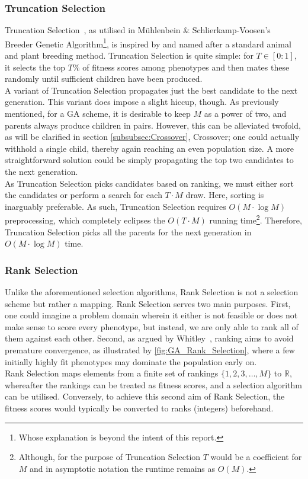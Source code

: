 \subsubsection{Truncation Selection}
Truncation Selection~\cite{Wiki-truncation-selection}, as utilised in Mühlenbein \& Schlierkamp-Voosen's~\cite{Truncation-Selection-Breeder-Algorithm} Breeder Genetic Algorithm\footnote{Whose explanation is beyond the intent of this report.}, is inspired by and named after a standard animal and plant breeding method. Truncation Selection is quite simple: for \(T \in [0:1]\), it selects the top $T\%$ of fitness scores among phenotypes and then mates these randomly until sufficient children have been produced.
\\
A variant of Truncation Selection propagates just the best candidate to the next generation. This variant does impose a slight hiccup, though. As previously mentioned, for a GA scheme, it is desirable to keep $M$ as a power of two, and parents always produce children in pairs. However, this can be alleviated twofold, as will be clarified in section \ref{subsubsec:Crossover}, Crossover; one could actually withhold a single child, thereby again reaching an even population size. A more straightforward solution could be simply propagating the top two candidates to the next generation.
\\
As Truncation Selection picks candidates based on ranking, we must either sort the candidates or perform a search for each \(T \cdot M\) draw. Here, sorting is inarguably preferable. As such, Truncation Selection requires \(O(M \cdot \log M ) \) preprocessing, which completely eclipses the \( O( T \cdot M ) \) running time\footnote{Although, for the purpose of Truncation Selection $T$ would be a coefficient for $M$ and in asymptotic notation the runtime remains as $O(M)$.}. Therefore, Truncation Selection picks all the parents for the next generation in \(O(M \cdot \log M ) \) time.

\subsubsection{Rank Selection}
Unlike the aforementioned selection algorithms, Rank Selection is not a selection scheme but rather a mapping. Rank Selection serves two main purposes. First, one could imagine a problem domain wherein it either is not feasible or does not make sense to score every phenotype, but instead, we are only able to rank all of them against each other. Second, as argued by Whitley~\cite{Rank-Selection-Usefullness}, ranking aims to avoid premature convergence, as illustrated by \autoref{fig:GA_Rank_Selection}, where a few initially highly fit phenotypes may dominate the population early on.
\\
Rank Selection maps elements from a finite set of rankings $\{1, 2, 3, \hdots, M\}$ to $\mathbb{R}$, whereafter the rankings can be treated as fitness scores, and a selection algorithm can be utilised. Conversely, to achieve this second aim of Rank Selection, the fitness scores would typically be converted to ranks (integers) beforehand.

